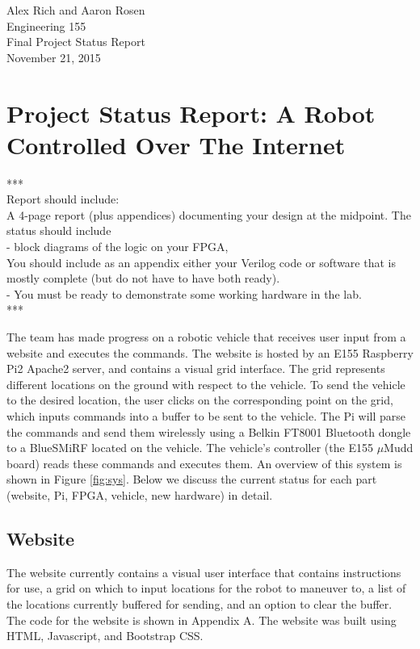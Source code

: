 \documentclass[11pt]{article}
\begin{document}
\begin{flushright}
Alex Rich and Aaron Rosen\\
Engineering 155 \\ 
Final Project Status Report\\
November 21, 2015
\end{flushright}
\section{Project Status Report: A Robot Controlled Over The Internet}

***\\
Report should include:\\
A 4-page report (plus appendices) documenting your design at the midpoint. The status should include 
\\- block diagrams of the logic on your FPGA, 
\\ You should include as an appendix either your Verilog code or software that is mostly complete (but do not have to have both ready). 
\\- You must be ready to demonstrate some working hardware in the lab.
\\***

The team has made progress on a robotic vehicle that receives user input from a website and executes the commands. The website is hosted by an E155 Raspberry Pi2 Apache2 server, and contains a visual grid interface.  The grid represents different locations on the ground with respect to the vehicle.  To send the vehicle to the desired location, the user clicks on the corresponding point on the grid, which inputs commands into a buffer to be sent to the vehicle.  The Pi will parse the commands and send them wirelessly using a Belkin FT8001 Bluetooth dongle to a BlueSMiRF located on the vehicle.  The vehicle's controller (the E155 $\mu$Mudd board) reads these commands and executes them. An overview of this system is shown in Figure \ref{fig:sys}. Below we discuss the current status for each part (website, Pi, FPGA, vehicle, new hardware) in detail.

\subsection{Website}
The website currently contains a visual user interface that contains instructions for use, a grid on which to input locations for the robot to maneuver to, a list of the locations currently buffered for sending, and an option to clear the buffer. The code for the website is shown in Appendix A. The website was built using HTML, Javascript, and Bootstrap CSS. 
\end{document}
